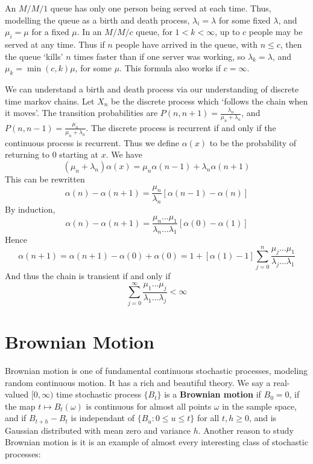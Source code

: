 An $M/M/1$ queue has only one person being served at each time. Thus, modelling the queue as a birth and death process, $\lambda_i = \lambda$ for some fixed $\lambda$, and $\mu_i = \mu$ for a fixed $\mu$. In an $M/M/c$ queue, for $1 < k < \infty$, up to $c$ people may be served at any time. Thus if $n$ people have arrived in the queue, with $n \leq c$, then the queue `kills' $n$ times faster than if one server was working, so $\lambda_k = \lambda$, and $\mu_k = \min(c,k) \mu$, for some $\mu$. This formula also works if $c = \infty$.

We can understand a birth and death process via our understanding of discrete time markov chains. Let $X_n$ be the discrete process which `follows the chain when it moves'. The transition probabilities are $P(n,n+1) = \frac{\lambda_n}{\mu_n + \lambda_n}$, and $P(n,n-1) = \frac{\mu_n}{\mu_n + \lambda_n}$. The discrete process is recurrent if and only if the continuous process is recurrent. Thus we define $\alpha(x)$ to be the probability of returning to 0 starting at $x$. We have
%
\[ (\mu_n + \lambda_n) \alpha(x) = \mu_n \alpha(n-1) + \lambda_n \alpha(n+1) \]
%
This can be rewritten
%
\[ \alpha(n) - \alpha(n+1) = \frac{\mu_n}{\lambda_n} [\alpha(n-1) - \alpha(n)] \]
%
By induction,
%
\[ \alpha(n) - \alpha(n+1) = \frac{\mu_n \dots \mu_1}{\lambda_n \dots \lambda_1} [\alpha(0) - \alpha(1)] \]
%
Hence
%
\[ \alpha(n+1) = \alpha(n+1) - \alpha(0) + \alpha(0) = 1 + [\alpha(1) - 1] \sum_{j = 0}^n \frac{\mu_j \dots \mu_1}{\lambda_j \dots \lambda_1} \]
%
And thus the chain is transient if and only if
%
\[ \sum_{j = 0}^\infty \frac{\mu_1 \dots \mu_j}{\lambda_1 \dots \lambda_j} < \infty \]






\chapter{Brownian Motion}

Brownian motion is one of fundamental continuous stochastic processes, modeling random continuous motion. It has a rich and beautiful theory. We say a real-valued $[0,\infty)$ time stochastic process $\{ B_t \}$ is a {\bf Brownian motion} if $B_0 = 0$, if the map $t \mapsto B_t(\omega)$ is continuous for almost all points $\omega$ in the sample space, and if $B_{t+h} - B_t$ is independant of $\{ B_u: 0 \leq u \leq t \}$ for all $t, h \geq 0$, and is Gaussian distributed with mean zero and variance $h$. Another reason to study Brownian motion is it is an example of almost every interesting class of stochastic processes:

